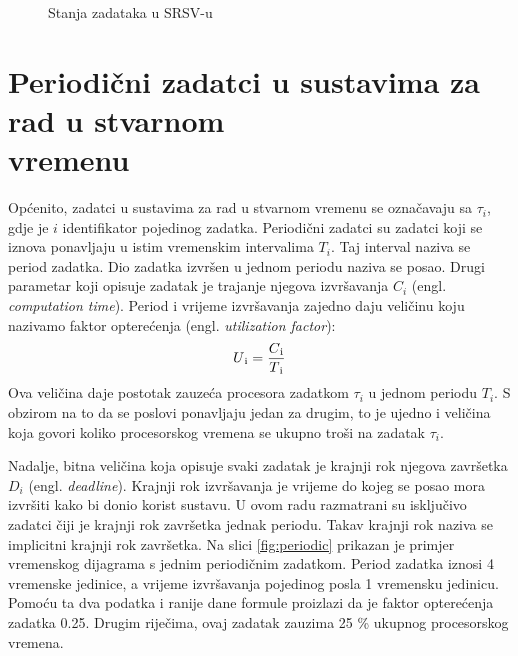 \documentclass[../zavrsni.tex]{subfiles}
\begin{document}
\begin{figure}[!htb]
    \caption{\label{fig:my-label} Stanja zadataka u SRSV-u}
  \end{figure}

\section{Periodični zadatci u sustavima za rad u stvarnom \\vremenu}

Općenito, zadatci u sustavima za rad u stvarnom vremenu se označavaju sa $\tau_i$, gdje je $i$ identifikator pojedinog zadatka. 
Periodični zadatci su zadatci koji se iznova ponavljaju u istim vremenskim intervalima $T_i$. Taj interval naziva se period zadatka.
Dio zadatka izvršen u jednom periodu naziva se posao.
Drugi parametar koji opisuje zadatak je trajanje njegova izvršavanja $C_i$ (engl. \textit{computation time}). Period i vrijeme izvršavanja zajedno daju veličinu 
koju nazivamo faktor opterećenja (engl. \textit{utilization factor}):
\begin{equation*}
  U\textsubscript{i} = \frac{C\textsubscript{i}}{T\textsubscript{i}}
\end{equation*}
Ova veličina daje postotak zauzeća procesora zadatkom $\tau_i$ u jednom periodu $T_i$. S obzirom na to da se poslovi
ponavljaju jedan za drugim, to je ujedno i veličina koja govori koliko procesorskog vremena se ukupno troši na zadatak $\tau_i$.

Nadalje, bitna veličina koja opisuje svaki zadatak je krajnji rok njegova završetka $D_i$  (engl. \textit{deadline}). Krajnji rok izvršavanja je vrijeme 
do kojeg se posao mora izvršiti kako bi donio korist sustavu. U ovom radu razmatrani su 
isključivo zadatci čiji je krajnji rok završetka jednak periodu. Takav krajnji rok naziva se implicitni krajnji rok završetka. 
Na slici \ref{fig:periodic} prikazan je primjer vremenskog dijagrama s jednim periodičnim zadatkom.
Period zadatka iznosi 4 vremenske jedinice, a vrijeme izvršavanja pojedinog posla 1 vremensku jedinicu. Pomoću ta dva podatka i ranije 
dane formule proizlazi da je faktor opterećenja zadatka 0.25. Drugim riječima, ovaj zadatak zauzima 25 \% ukupnog procesorskog vremena.
\end{document}
